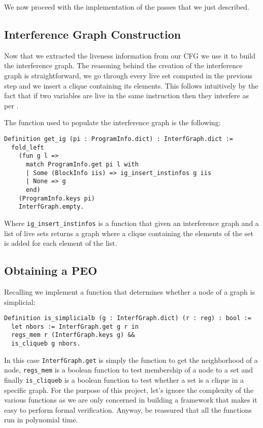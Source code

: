 We now proceed with the implementation of the passes that we just described.

\subsection{Interference Graph Construction}

Now that we extracted the liveness information from our CFG we use it to build the interference graph.
The reasoning behind the creation of the interference graph is straightforward, we go through every live set computed in the previous step and we insert a clique containing its elements. This follows intuitively by the fact that if two variables are live in the same instruction then they interfere as per .

The function used to populate the interference graph is the following:

\begin{lstlisting}[style=Coq]
Definition get_ig (pi : ProgramInfo.dict) : InterfGraph.dict :=
  fold_left
    (fun g l =>
      match ProgramInfo.get pi l with
      | Some (BlockInfo iis) => ig_insert_instinfos g iis
      | None => g
      end)
    (ProgramInfo.keys pi)
    InterfGraph.empty.
\end{lstlisting}

Where \texttt{ig\_insert\_instinfos} is a function that given an interference graph and a list of live sets returns a graph where a clique containing the elements of the set is added for each element of the list.

\subsection{Obtaining a PEO}

Recalling  we implement a function that determines whether a node of a graph is simplicial:

\begin{lstlisting}[style=Coq]
Definition is_simplicialb (g : InterfGraph.dict) (r : reg) : bool :=
  let nbors := InterfGraph.get g r in
  regs_mem r (InterfGraph.keys g) &&
  is_cliqueb g nbors.
\end{lstlisting}

In this case \texttt{InterfGraph.get} is simply the function to get the neighborhood of a node, \texttt{regs\_mem} is a boolean function to test membership of a node to a set and finally \texttt{is\_cliqueb} is a boolean function to test whether a set is a clique in a specific graph.
For the purpose of this project, let's ignore the complexity of the various functions as we are only concerned in building a framework that makes it easy to perform formal verification. Anyway, be reassured that all the functions run in polynomial time.

